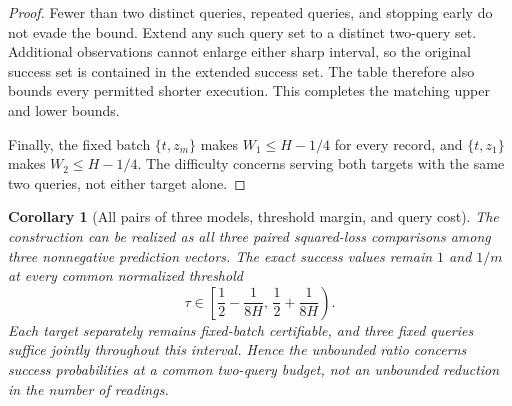 \documentclass[12pt]{article}
\newtheorem{corollary}{Corollary}
\begin{document}
\begin{proof}
Fewer than two distinct queries, repeated queries, and stopping early do
not evade the bound. Extend any such query set to a distinct two-query
set. Additional observations cannot enlarge either sharp interval, so the
original success set is contained in the extended success set. The table
therefore also bounds every permitted shorter execution. This completes
the matching upper and lower bounds.

Finally, the fixed batch $\{t,z_m\}$ makes $W_1\leq H-1/4$ for every
record, and $\{t,z_1\}$ makes $W_2\leq H-1/4$. The difficulty concerns
serving both targets with the same two queries, not either target alone.
\end{proof}

\begin{corollary}[All pairs of three models, threshold margin, and query cost]
\label{cor:all-pairs-collapse}
The construction can be realized as all three paired squared-loss
comparisons among three nonnegative prediction vectors. The exact success
values remain $1$ and $1/m$ at every common normalized threshold
\[
 \tau\in\left[\frac12-\frac1{8H},\,
                    \frac12+\frac1{8H}\right).
\]
Each target separately remains fixed-batch certifiable, and three fixed
queries suffice jointly throughout this interval. Hence the unbounded
ratio concerns success probabilities at a common two-query budget, not
an unbounded reduction in the number of readings.
\end{corollary}
\end{document}
